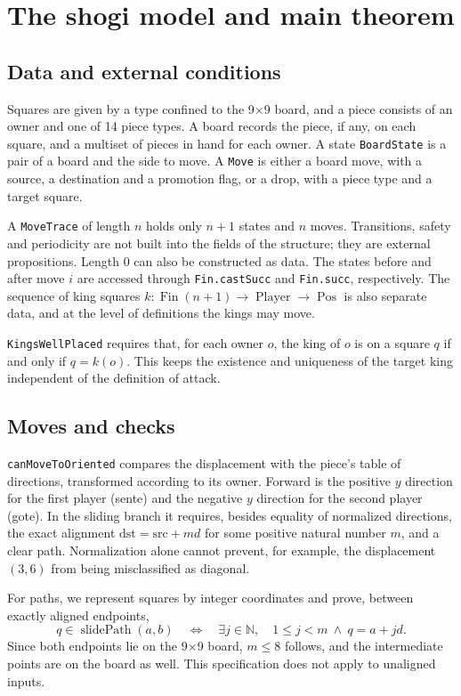 \documentclass[a4paper,11pt]{article}
\newcommand{\code}[1]{{\small\nolinkurl{#1}}}
\newcommand{\decl}[1]{\par\noindent{\footnotesize Lean: \nolinkurl{#1}}\par}
\theoremstyle{definition}
\begin{document}
\section{The shogi model and main theorem}
\subsection{Data and external conditions}
Squares are given by a type confined to the 9\(\times\)9 board, and a piece consists of an owner and one of 14 piece types.
A board records the piece, if any, on each square, and a multiset of pieces in hand for each owner.
A state \code{BoardState} is a pair of a board and the side to move.
A \code{Move} is either a board move, with a source, a destination and a promotion flag, or a drop, with a piece type and a target square.

A \code{MoveTrace} of length \(n\) holds only \(n+1\) states and \(n\) moves.
Transitions, safety and periodicity are not built into the fields of the structure; they are external propositions.
Length 0 can also be constructed as data.
The states before and after move \(i\) are accessed through \code{Fin.castSucc} and \code{Fin.succ}, respectively.
The sequence of king squares \(k:\operatorname{Fin}(n+1)\to\operatorname{Player}\to\operatorname{Pos}\) is also separate data, and at the level of definitions the kings may move.

\code{KingsWellPlaced} requires that, for each owner \(o\), the king of \(o\) is on a square \(q\) if and only if \(q=k(o)\).
This keeps the existence and uniqueness of the target king independent of the definition of attack.

\subsection{Moves and checks}
\code{canMoveToOriented} compares the displacement with the piece's table of directions, transformed according to its owner.
Forward is the positive \(y\) direction for the first player (sente) and the negative \(y\) direction for the second player (gote).
In the sliding branch it requires, besides equality of normalized directions, the exact alignment \(\mathrm{dst}=\mathrm{src}+m d\) for some positive natural number \(m\), and a clear path.
Normalization alone cannot prevent, for example, the displacement \((3,6)\) from being misclassified as diagonal.

For paths, we represent squares by integer coordinates and prove, between exactly aligned endpoints,
\[
 q\in\operatorname{slidePath}(a,b)
 \quad\Longleftrightarrow\quad
 \exists j\in\mathbb N,\quad 1\leq j<m\ \land\ q=a+jd.
\]
Since both endpoints lie on the 9\(\times\)9 board, \(m\leq8\) follows, and the intermediate points are on the board as well.
This specification does not apply to unaligned inputs.
\decl{MPC.mem_slidePath_iff_of_exact_steps}
\end{document}
